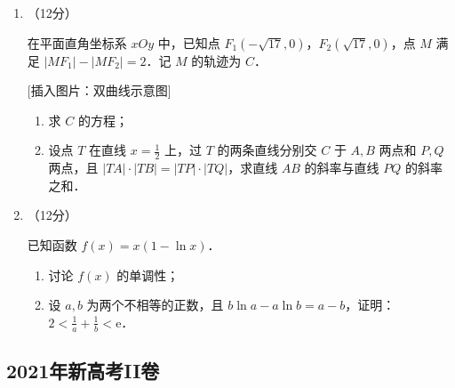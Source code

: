 \begin{description}
\begin{enumerate}[leftmargin=5pt]
        \item （12分）

        在平面直角坐标系 $xOy$ 中，已知点 $F_{1}(-\sqrt{17},0)$，$F_{2}(\sqrt{17},0)$，点 $M$ 满足 $\left|MF_{1}\right|-\left|MF_{2}\right|=2$．记 $M$ 的轨迹为 $C$．

        \textsf{[插入图片：双曲线示意图]}

        \begin{enumerate}[label=(\arabic*)]
            \item 求 $C$ 的方程；
            \item 设点 $T$ 在直线 $x=\frac{1}{2}$ 上，过 $T$ 的两条直线分别交 $C$ 于 $A,B$ 两点和 $P,Q$ 两点，且 $|TA|\cdot|TB|=|TP|\cdot|TQ|$，求直线 $AB$ 的斜率与直线 $PQ$ 的斜率之和．
        \end{enumerate}

        \item （12分）

        已知函数 $f(x)=x(1-\ln x)$．

        \begin{enumerate}[label=(\arabic*)]
            \item 讨论 $f(x)$ 的单调性；
            \item 设 $a,b$ 为两个不相等的正数，且 $b\ln a-a\ln b=a-b$，证明：$2<\frac{1}{a}+\frac{1}{b}<\mathrm{e}$．
        \end{enumerate}
    \end{enumerate}
\end{description}
\clearpage


\subsection{2021年新高考II卷}\label{gk:2021年新高考II卷}

